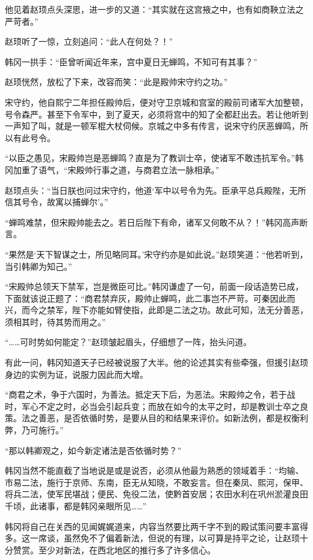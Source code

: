 他见着赵顼点头深思，进一步的又道：“其实就在这宫掖之中，也有如商鞅立法之严苛者。”

赵顼听了一惊，立刻追问：“此人在何处？！”

韩冈一拱手：“臣曾听闻近年来，宫中夏日无蝉鸣，不知可有其事？”

赵顼恍然，放松了下来，改容而笑：“此是殿帅宋守约之功。”

宋守约，他自熙宁二年担任殿帅后，便对守卫京城和宫室的殿前司诸军大加整顿，号令森严。甚至下令军中，到了夏天，必须将宫中的知了全都赶出去。若让他听到一声知了叫，就是一顿军棍大杖伺候。京城之中多有传言，说宋守约厌恶蝉鸣，所以有此号令。

“以臣之愚见，宋殿帅岂是恶蝉鸣？直是为了教训士卒，使诸军不敢违抗军令。”韩冈加重了语气，“宋殿帅行事之道，与商君立法一脉相承。”

赵顼点头：“当日朕也问过宋守约，他道‘军中以号令为先。臣承平总兵殿陛，无所信其号令，故寓以捕蝉尔’。”

“蝉鸣难禁，但宋殿帅能去之。若日后陛下有命，诸军又何敢不从？！”韩冈高声断言。

“果然是‘天下智谋之士，所见略同耳。’宋守约亦是如此说。”赵顼笑道：“他若听到，当引韩卿为知己。”

“宋殿帅总领天下禁军，岂是微臣可比。”韩冈谦虚了一句，前面一段话造势已成，下面就该说正题了：“商君禁弃灰，殿帅止蝉鸣，此二事岂不严苛。可秦因此而兴，而今之禁军，陛下亦能如臂使指，此即是二法之功。故此可知，法无分善恶，须相其时，待其势而用之。”

“……可时势如何能定？”赵顼皱起眉头，仔细想了一阵，抬头问道。

有此一问，韩冈知道天子已经被说服了大半。他的论述其实有些牵强，但援引赵顼身边的实例为证，说服力因此而大增。

“商君之术，争于六国时，为善法。抵定天下后，为恶法。宋殿帅之令，若于战时，军心不定之时，必当会引起兵变；而放在如今的太平之时，却是教训士卒之良策。法之善恶，是否依循时势，是要从目的和结果来评价。如新法例，都是权衡利弊，乃可施行。”

“那以韩卿观之，如今新定诸法是否依循时势？”

韩冈当然不能直截了当地说是或是说否，必须从他最为熟悉的领域着手：“均输、市易二法，施行于京师、东南，臣无从知晓，不敢妄言。但在秦凤、熙河，保甲、将兵二法，使军民堪战；便民、免役二法，使黔首安居；农田水利在巩州淤灌良田千顷，此诸事，都是韩冈亲眼所见……”

韩冈将自己在关西的见闻娓娓道来，内容当然要比两千字不到的殿试策问要丰富得多。这一席谈，虽然免不了偏着新法，但说的有理，以可算是持平之论，让赵顼十分赞赏。至少对新法，在西北地区的推行多了许多信心。

